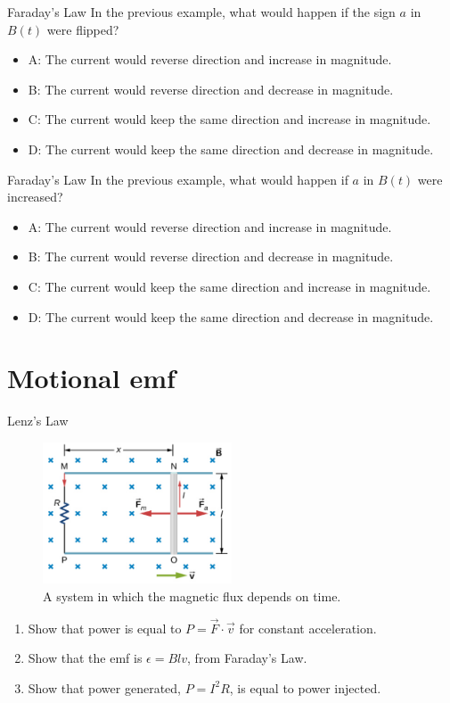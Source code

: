 \documentclass{beamer}
\begin{document}
\begin{frame}{Faraday's Law}
In the previous example, what would happen if the sign $a$ in $B(t)$ were flipped?
\begin{itemize}
\item A: The current would reverse direction and increase in magnitude.
\item B: The current would reverse direction and decrease in magnitude.
\item C: The current would keep the same direction and increase in magnitude.
\item D: The current would keep the same direction and decrease in magnitude.
\end{itemize}
\end{frame}

\begin{frame}{Faraday's Law}
In the previous example, what would happen if $a$ in $B(t)$ were increased?
\begin{itemize}
\item A: The current would reverse direction and increase in magnitude.
\item B: The current would reverse direction and decrease in magnitude.
\item C: The current would keep the same direction and increase in magnitude.
\item D: The current would keep the same direction and decrease in magnitude.
\end{itemize}
\end{frame}

\section{Motional emf}

\begin{frame}{Lenz's Law}
\small
\begin{figure}
\centering
\includegraphics[width=0.5\textwidth]{figures/loop2.png}
\caption{\label{fig:loop4} A system in which the magnetic flux depends on time.}
\end{figure}
\begin{enumerate}
\item Show that power is equal to $P = \vec{F} \cdot \vec{v}$ for constant acceleration.
\item Show that the emf is $\epsilon = B l v$, from Faraday's Law.
\item Show that power generated, $P = I^2 R$, is equal to power injected.
\end{enumerate}
\end{frame}
\end{document}

